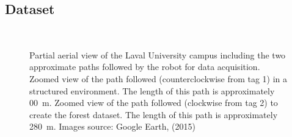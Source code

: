 \subsection{Dataset}
\begin{figure}[htpb]
    \centering
    \\ \vspace{3mm}
     \hspace{2mm}
    \caption{\protect{} Partial aerial view of the Laval University campus including the two approximate paths followed by the robot for data acquisition. \protect{} Zoomed view of the path followed (counterclockwise from tag 1) in a structured environment. The length of this path is approximately \SI{00}{\meter}. \protect{} Zoomed view of the path followed (clockwise from tag 2) to create the forest dataset. The length of this path is approximately \SI{280}{\meter}. Images source: Google Earth, (2015)}
    \label{fig:chap_slam_path}
\end{figure}


